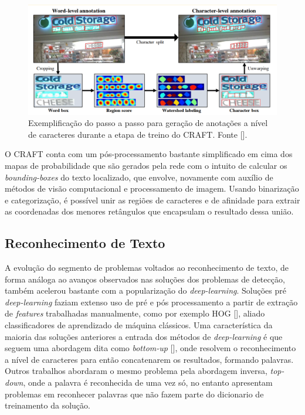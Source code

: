 \begin{figure}
    \centering
    \includegraphics[width=\textwidth]{figs/craft-char-level-annotation.png}
    \caption{Exemplificação do passo a passo para geração de anotações a nível de caracteres durante a etapa de treino do CRAFT. Fonte [].}
    \label{fig:craft_char_level_annotation}
\end{figure}

O CRAFT conta com um pós-processamento bastante simplificado em cima dos mapas de probabilidade que são gerados pela rede com o intuito de calcular os \textit{bounding-boxes} do texto localizado, que envolve, novamente com auxílio de métodos de visão computacional e processamento de imagem. Usando binarização e categorização, é possível unir as regiões de caracteres e de afinidade para extrair as coordenadas dos menores retângulos que encapsulam o resultado dessa união.


\subsection{Reconhecimento de Texto}
A evolução do segmento de problemas voltados ao reconhecimento de texto, de forma análoga ao avanços observados nas soluções dos problemas de detecção, também acelerou bastante com a popularização do \textit{deep-learning}. Soluções pré \textit{deep-learning} faziam extenso uso de pré e pós processamento a partir de extração de \textit{features} trabalhadas manualmente, como por exemplo HOG [], aliado classificadores de aprendizado de máquina clássicos. Uma característica da maioria das soluções anteriores a entrada dos métodos de \textit{deep-learning} é que seguem uma abordagem dita como \textit{bottom-up} [], onde resolvem o reconhecimento a nível de caracteres para então concatenarem os resultados, formando palavras. Outros trabalhos abordaram o mesmo problema pela abordagem inversa, \textit{top-down}, onde a palavra é reconhecida de uma vez só, no entanto apresentam problemas em reconhecer palavras que não fazem parte do dicionario de treinamento da solução.

